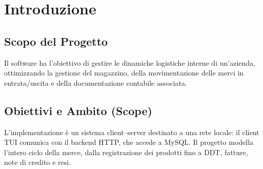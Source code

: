 \documentclass[a4paper,12pt]{article}
\begin{document}

\section{Introduzione}

\subsection{Scopo del Progetto}
Il software ha l'obiettivo di gestire le dinamiche logistiche interne di un'azienda, ottimizzando la gestione del magazzino, della movimentazione delle merci in entrata/uscita e della documentazione contabile associata.

\subsection{Obiettivi e Ambito (Scope)}
L'implementazione è un sistema client--server destinato a una rete locale: il client TUI comunica con il backend HTTP, che accede a MySQL. Il progetto modella l'intero ciclo della merce, dalla registrazione dei prodotti fino a DDT, fatture, note di credito e resi.
\end{document}
